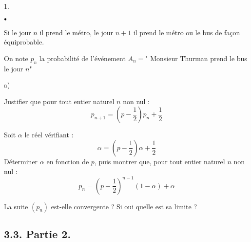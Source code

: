 \documentclass[11pt]{article}%
\begin{document}
\begin{noliste}{1.}
\begin{noliste}{$\scriptstyle \bullet$}
\item Si le jour $n$ il prend le métro, le jour $n + 1$ il prend le
métro ou le bus de façon équiprobable.
\end{noliste}

On note $p_{n}$ la probabilité de l'événement $A_{n} = $" Monsieur
Thurman prend le bus le jour $n$"

\begin{noliste}{a)}
 \setlength{\itemsep}{2mm}
\item Justifier que pour tout entier naturel $n$ non nul :
\[
p_{n + 1} = \left( p-\frac{1}{2}\right) p_{n} + \frac{1}{2}
\]

\item Soit $\alpha $ le réel vérifiant :
\[
\alpha = \left( p-\frac{1}{2}\right) \alpha + \frac{1}{2}
\]
Déterminer $\alpha $ en fonction de $p$, puis montrer que, pour tout
entier naturel $n$ non nul :
\[
p_{n} = \left( p-\frac{1}{2}\right) ^{n-1}\left( 1-\alpha \right) +
\alpha 
\]

\item La suite $\left( p_{n}\right) $ est-elle convergente ? Si oui
quelle
est sa limite ?
\end{noliste}
\end{noliste}

\subsection{3.3. Partie 2.}
\end{document}
